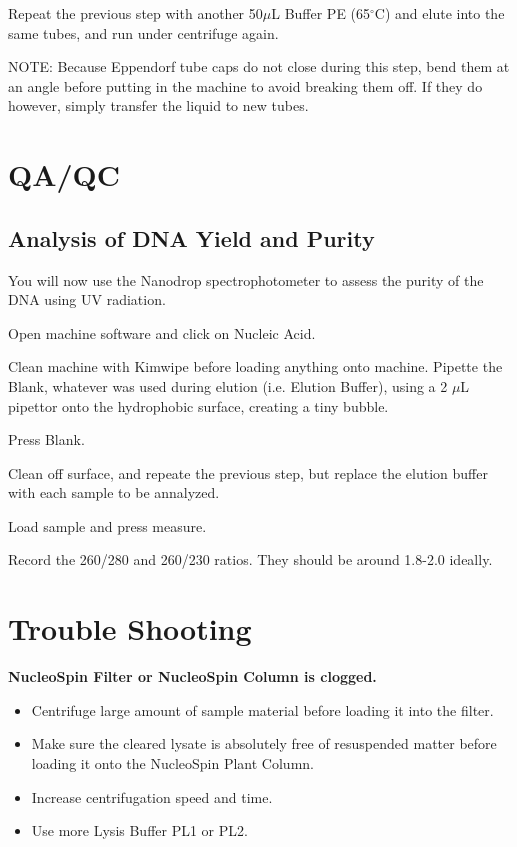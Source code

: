 \documentclass[12pt]{../SOP3_alpha}\usepackage[]{graphicx}\usepackage[]{color}
\begin{document}
\NP Repeat the previous step with another 50$\mu$L Buffer PE (65$^\circ$C) and elute into the same tubes, and run under centrifuge again.

\NP NOTE: Because Eppendorf tube caps do not close during this step, bend them at an angle before putting in the machine to avoid breaking them off. If they do however, simply transfer the liquid to new tubes.


\section{QA/QC}

\subsection*{Analysis of DNA Yield and Purity}

\NP You will now use the Nanodrop spectrophotometer to assess the purity of the DNA using UV radiation. 

\NP Open machine software and click on Nucleic Acid.

\NP Clean machine with Kimwipe before loading anything onto machine. 
\NP Pipette the Blank, whatever was used during elution (i.e. Elution Buffer), using a 2 $\mu$L pipettor onto the hydrophobic surface, creating a tiny bubble.

\NP Press Blank.

\NP Clean off surface, and repeate the previous step, but replace the elution buffer with each sample to be annalyzed.

\NP Load sample and press measure.

\NP Record the 260/280 and 260/230 ratios. They should be around 1.8-2.0 ideally. 

\section{Trouble Shooting}

\NP \textbf{NucleoSpin Filter or NucleoSpin Column is clogged.}
\begin{itemize}
  \item Centrifuge large amount of sample material before loading it into the filter.
  \item Make sure the cleared lysate is absolutely free of resuspended matter before loading it onto the NucleoSpin Plant Column.
 \item Increase centrifugation speed and time.
 \item Use more Lysis Buffer PL1 or PL2.
\end{itemize}
\end{document}
